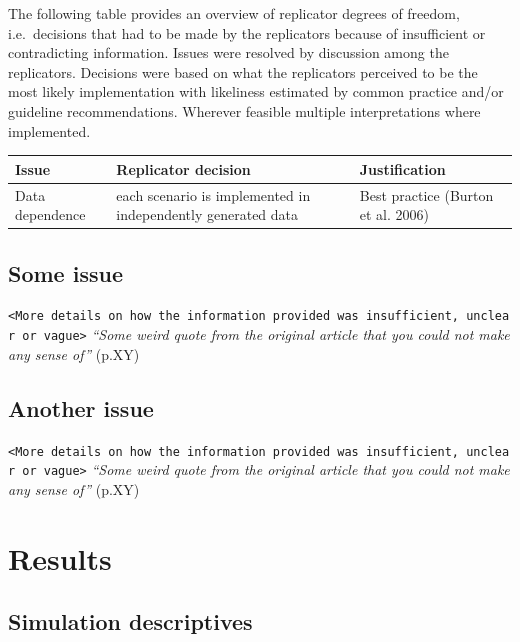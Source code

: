 \documentclass[10,a4paperpaper,]{article}
\begin{document}
The following table provides an overview of replicator degrees of
freedom, i.e.~decisions that had to be made by the replicators because
of insufficient or contradicting information. Issues were resolved by
discussion among the replicators. Decisions were based on what the
replicators perceived to be the most likely implementation with
likeliness estimated by common practice and/or guideline
recommendations. Wherever feasible multiple interpretations where
implemented.

\begin{longtable}[]{@{}
  >{\raggedright\arraybackslash}p{}
  >{\raggedright\arraybackslash}p{}
  >{\raggedright\arraybackslash}p{}@{}}
\toprule
Issue & Replicator decision & Justification \\
\midrule
\endhead
Data dependence & each scenario is implemented in independently
generated data & Best practice (Burton et al. 2006) \\
\bottomrule
\end{longtable}

\subsection{Some issue}

\texttt{\textless{}More\ details\ on\ how\ the\ information\ provided\ was\ insufficient,\ unclear\ or\ vague\textgreater{}}
\emph{``Some weird quote from the original article that you could not
make any sense of''} (p.XY)

\subsection{Another issue}

\texttt{\textless{}More\ details\ on\ how\ the\ information\ provided\ was\ insufficient,\ unclear\ or\ vague\textgreater{}}
\emph{``Some weird quote from the original article that you could not
make any sense of''} (p.XY)

\section{Results}

\subsection{Simulation descriptives}
\end{document}
